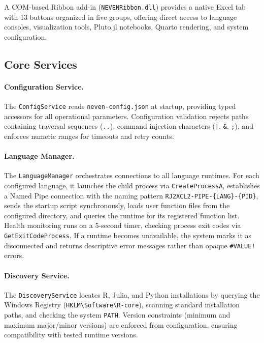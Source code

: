 A COM-based Ribbon add-in (\texttt{NEVENRibbon.dll}) provides a native Excel tab with 13 buttons organized in five groups, offering direct access to language consoles, visualization tools, Pluto.jl notebooks, Quarto rendering, and system configuration.

\subsection{Core Services}

\paragraph{Configuration Service.}
The \texttt{ConfigService} reads \texttt{neven-config.json} at startup, providing typed accessors for all operational parameters. Configuration validation rejects paths containing traversal sequences (\texttt{..}), command injection characters (\texttt{|}, \texttt{\&}, \texttt{;}), and enforces numeric ranges for timeouts and retry counts.

\paragraph{Language Manager.}
The \texttt{LanguageManager} orchestrates connections to all language runtimes. For each configured language, it launches the child process via \texttt{CreateProcessA}, establishes a Named Pipe connection with the naming pattern \texttt{RJ2XCL2-PIPE-\{LANG\}-\{PID\}}, sends the startup script synchronously, loads user function files from the configured directory, and queries the runtime for its registered function list. Health monitoring runs on a 5-second timer, checking process exit codes via \texttt{GetExitCodeProcess}. If a runtime becomes unavailable, the system marks it as disconnected and returns descriptive error messages rather than opaque \texttt{\#VALUE!} errors.

\paragraph{Discovery Service.}
The \texttt{DiscoveryService} locates R, Julia, and Python installations by querying the Windows Registry (\texttt{HKLM\textbackslash Software\textbackslash R-core}), scanning standard installation paths, and checking the system \texttt{PATH}. Version constraints (minimum and maximum major/minor versions) are enforced from configuration, ensuring compatibility with tested runtime versions.


